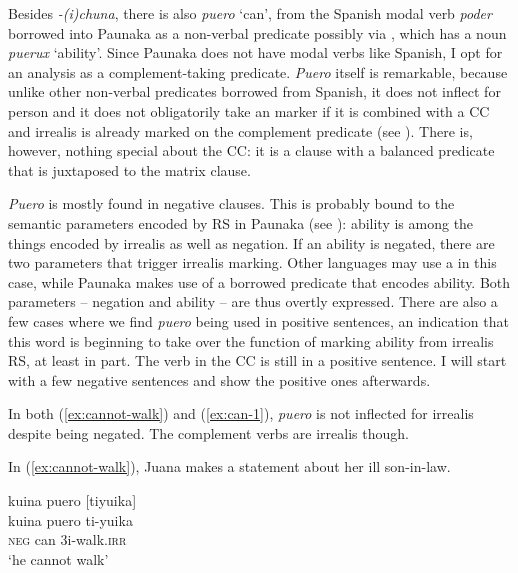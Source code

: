 Besides \textit{-(i)chuna}, there is also \textit{puero} ‘can’, from the Spanish modal verb \textit{poder} borrowed into Paunaka as a non-verbal predicate possibly via , which has a noun \textit{puerux} ‘ability’. Since Paunaka does not have modal verbs like Spanish, I opt for an analysis as a complement-taking predicate. \textit{Puero} itself is remarkable, because unlike other non-verbal predicates borrowed from Spanish, it does not inflect for person and it does not obligatorily take an  marker if it is combined with a CC and irrealis is already marked on the complement predicate (see ). There is, however, nothing special about the CC: it is a clause with a balanced predicate that is juxtaposed to the matrix clause.

 \textit{Puero} is mostly found in negative clauses. This is probably bound to the semantic parameters encoded by  RS in Paunaka (see ): ability is among the things encoded by irrealis as well as negation. If an ability is negated, there are two parameters that trigger irrealis marking. Other languages may use a  in this case, while Paunaka makes use of a borrowed predicate that encodes ability. Both parameters – negation and ability – are thus overtly expressed. There are also a few cases where we find \textit{puero} being used in positive sentences, an indication that this word is beginning to take over the function of marking ability from irrealis RS, at least in part. The verb in the CC is still  in a positive sentence. I will start with a few negative sentences and show the positive ones afterwards.

In both (\ref{ex:cannot-walk}) and (\ref{ex:can-1}), \textit{puero} is not inflected for irrealis despite being negated. The complement verbs are irrealis though.

In (\ref{ex:cannot-walk}), Juana makes a statement about her ill son-in-law.

\ea\label{ex:cannot-walk}
\begingl
\glpreamble kuina puero \textup{[}tiyuika\textup{]}\\
\gla kuina puero ti-yuika\\
\glb \textsc{neg} can 3i-walk.\textsc{irr}\\
\glft ‘he cannot walk’
\endgl
\trailingcitation{[jxx-p110923l-1.048]}
\xe
{}

